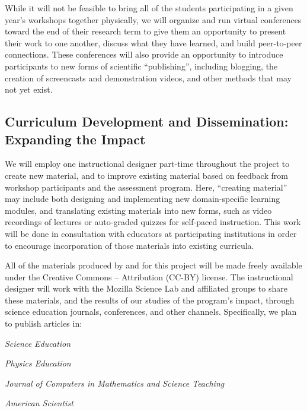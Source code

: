 \documentclass{proposalnsf}
\newlength{\up}
\begin{document}
While it will not be feasible to bring all of the students
participating in a given year's workshops together physically, we will
organize and run virtual conferences toward the end of their research
term to give them an opportunity to present their work to one another,
discuss what they have learned, and build peer-to-peer connections.
These conferences will also provide an opportunity to introduce
participants to new forms of scientific ``publishing'', including
blogging, the creation of screencasts and demonstration videos, and
other methods that may not yet exist.

\subsection{Curriculum Development and Dissemination: Expanding the Impact}

We will employ one instructional designer part-time throughout the
project to create new material, and to improve existing material based
on feedback from workshop participants and the assessment program.
Here, ``creating material'' may include both designing and
implementing new domain-specific learning modules, and translating
existing materials into new forms, such as video recordings of
lectures or auto-graded quizzes for self-paced instruction.  This work
will be done in consultation with educators at participating
institutions in order to encourage incorporation of those materials
into existing curricula.

All of the materials produced by and for this project will be made
freely available under the Creative Commons -- Attribution (CC-BY)
license.  The instructional designer will work with the Mozilla
Science Lab and affiliated groups to share these materials, and the
results of our studies of the program's impact, through science
education journals, conferences, and other channels. Specifically, we
plan to publish articles in:

\begin{compactitem}

\item
  \emph{Science Education}

\item
  \emph{Physics Education}

\item
  \emph{Journal of Computers in Mathematics and Science Teaching}

\item
  \emph{American Scientist}

\end{compactitem}
\end{document}
